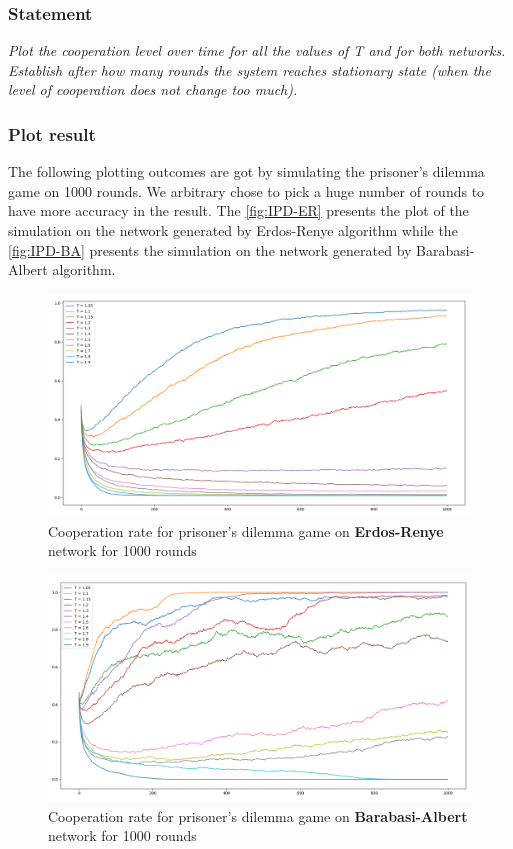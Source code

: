 \documentclass{article}
\begin{document}
\subsubsection*{Statement}
\textit{Plot the cooperation level over time for all the values of T and for both networks. Establish after how many rounds the system reaches stationary state (when the level of cooperation does not change too much).}

\subsubsection{Plot result}
The following plotting outcomes are got by simulating the prisoner's dilemma game on 1000 rounds. We arbitrary chose to pick a huge number of rounds to have more accuracy in the result. The \autoref{fig:IPD-ER} presents the plot of the simulation on the network generated by Erdos-Renye algorithm while the \autoref{fig:IPD-BA} presents the simulation on the network generated by Barabasi-Albert algorithm. 


\begin{figure}[h]
  \centering
  \includegraphics[scale=0.32]{fig/ER-1000rounds.png}
  \caption{Cooperation rate for prisoner's dilemma game on \textbf{Erdos-Renye} network for 1000 rounds}
  \label{fig:IPD-ER}
\end{figure}

\newpage
\begin{figure}[h]
  \centering
  \includegraphics[scale=0.32]{fig/BA-1000rounds.png}
  \caption{Cooperation rate for prisoner's dilemma game on \textbf{Barabasi-Albert} network for 1000 rounds}
  \label{fig:IPD-BA}
\end{figure}
\end{document}
